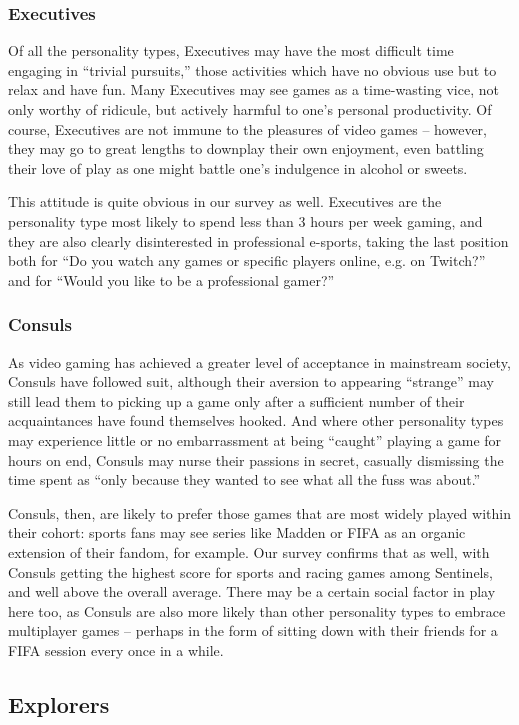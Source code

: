 \documentclass{article}
\begin{document}
\subsubsection{Executives}
Of all the personality types, Executives may have the most difficult time engaging in “trivial pursuits,” those activities which have no obvious use but to relax and have fun. Many Executives may see games as a time-wasting vice, not only worthy of ridicule, but actively harmful to one’s personal productivity. Of course, Executives are not immune to the pleasures of video games – however, they may go to great lengths to downplay their own enjoyment, even battling their love of play as one might battle one’s indulgence in alcohol or sweets.

This attitude is quite obvious in our survey as well. Executives are the personality type most likely to spend less than 3 hours per week gaming, and they are also clearly disinterested in professional e-sports, taking the last position both for “Do you watch any games or specific players online, e.g. on Twitch?” and for “Would you like to be a professional gamer?”
\subsubsection{Consuls}
As video gaming has achieved a greater level of acceptance in mainstream society, Consuls have followed suit, although their aversion to appearing “strange” may still lead them to picking up a game only after a sufficient number of their acquaintances have found themselves hooked. And where other personality types may experience little or no embarrassment at being “caught” playing a game for hours on end, Consuls may nurse their passions in secret, casually dismissing the time spent as “only because they wanted to see what all the fuss was about.”

Consuls, then, are likely to prefer those games that are most widely played within their cohort: sports fans may see series like Madden or FIFA as an organic extension of their fandom, for example. Our survey confirms that as well, with Consuls getting the highest score for sports and racing games among Sentinels, and well above the overall average. There may be a certain social factor in play here too, as Consuls are also more likely than other personality types to embrace multiplayer games – perhaps in the form of sitting down with their friends for a FIFA session every once in a while.
\subsection{Explorers}
\end{document}
